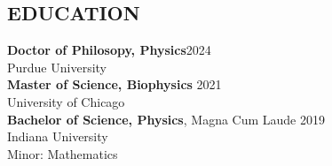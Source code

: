 \documentclass[margin, 10pt]{res} %
\begin{document}
\begin{resume}






\section{EDUCATION}

\textbf{Doctor of Philosopy, Physics}\hfill 2024 \\
Purdue University\\

\textbf{Master of Science, Biophysics} \hfill 2021\\
University of Chicago\\


\textbf{Bachelor of Science, Physics}, Magna Cum Laude \hfill 2019\\
Indiana University\\
Minor: Mathematics 


\end{resume}
\end{document}
